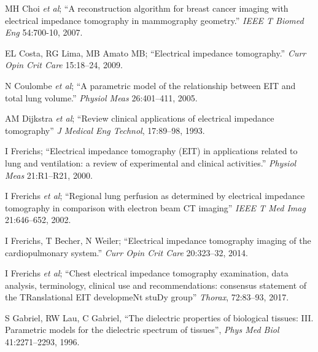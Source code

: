 \documentclass[12pt]{article} \usepackage[margin=3cm]{geometry} \usepackage[margin=20pt,font=small,labelfont=bf]{caption}\def\TBLWIDA{35mm}\def\TBLWIDB{95mm}
\newcommand{\ifmaxthree}[2]{#2 {\em et al}; }
\begin{document}
\begin{thebibliography}{00}
\ifmaxthree{
MH Choi, TJ Kao, D Isaacson, GJ Saulnier, JC Newell
}{
MH Choi
}
``A reconstruction algorithm for breast cancer imaging with electrical impedance tomography in mammography geometry.''
{\em IEEE T Biomed Eng} 54:700-10, 2007. %

EL Costa, RG Lima, MB Amato MB;
``Electrical impedance tomography.''
{\em Curr Opin Crit Care} 15:18--24, 2009.

\ifmaxthree{
N Coulombe, H Gagnon, F Marquis, Y Skrobik, R Guardo
}{
N Coulombe
}
``A parametric model of the relationship between EIT and total lung volume.''
{\em  Physiol Meas} 26:401--411, 2005.


\ifmaxthree{
AM Dijkstra, BH Brown, AD Leathard, ND Harris, DC Barber, DL Edbrooke,
}{
AM Dijkstra
}
``Review clinical applications of electrical impedance tomography''
{\em J Medical Eng Technol}, 17:89--98, 1993.

I Frerichs;
``Electrical impedance tomography (EIT) in applications related to lung and ventilation: a review of experimental and clinical activities.''
{\em  Physiol Meas} 21:R1--R21, 2000.

\ifmaxthree{
I Frerichs, J Hinz, P Herrmann, G Weisser, G Hahn, M Quintel, G Hellige.
}{
I Frerichs
}
``Regional lung  perfusion  as  determined  by  electrical
  impedance  tomography  in  comparison  with  electron beam CT imaging''
{\em IEEE T Med Imag} 21:646--652, 2002.

I Frerichs, T Becher, N Weiler; 
``Electrical impedance tomography imaging of the cardiopulmonary system.''
{\em Curr Opin Crit Care} 20:323--32, 2014.

\ifmaxthree{
I Frerichs, M Amato, A Van Kaam, D Tingay, Z Zhao, B Grychtol, M Bodenstein,
H; Gagnon, S Böhm, E Teschner, O Stenqvist, T Mauri, V Torsani, C Luigi,
A Schibler, G Wolf, D Gommers, S Leonhardt, A Adler
}{
I Frerichs
}
``Chest electrical impedance tomography
examination, data analysis, terminology, clinical use and recommendations:
consensus statement of the TRanslational EIT developmeNt stuDy group''
{\em Thorax}, 72:83--93, 2017.


S Gabriel, RW Lau, C Gabriel,
``The dielectric properties of biological tissues: III. Parametric models for the dielectric spectrum of tissues'',
{\em  Phys Med Biol} 41:2271--2293, 1996.


\end{thebibliography}
\end{document}
